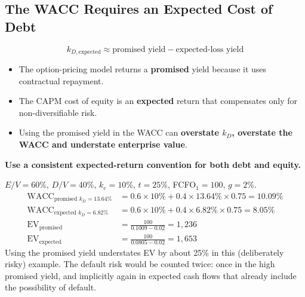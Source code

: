 \subsection{The WACC Requires an Expected Cost of Debt}
\begin{keybox}
\[
k_{D,\text{expected}}\approx\text{promised yield}-\text{expected-loss yield}
\]
\begin{itemize}[leftmargin=*]
  \item The option-pricing model returns a \textbf{promised} yield because it uses contractual repayment.
  \item The CAPM cost of equity is an \textbf{expected} return that compensates only for non-diversifiable risk.
  \item Using the promised yield in the WACC can \textbf{overstate $k_D$, overstate the WACC and understate enterprise value}.
\end{itemize}
\textbf{Use a consistent expected-return convention for both debt and equity.}
\end{keybox}

\begin{exbox}
$E/V=60\%$, $D/V=40\%$, $k_e=10\%$, $t=25\%$, FCFO$_1=100$, $g=2\%$.
\begin{align*}
\text{WACC}_{\text{promised }k_D=13.64\%}&=0.6\times10\%+0.4\times13.64\%\times0.75=10.09\%\\
\text{WACC}_{\text{expected }k_D=6.82\%}&=0.6\times10\%+0.4\times6.82\%\times0.75=8.05\%\\
\text{EV}_{\text{promised}}&=\frac{100}{0.1009-0.02}=1{,}236\\
\text{EV}_{\text{expected}}&=\frac{100}{0.0805-0.02}=1{,}653
\end{align*}
Using the promised yield understates EV by about 25\% in this (deliberately risky) example. The default risk would be counted twice: once in the high promised yield, and implicitly again in expected cash flows that already include the possibility of default.
\end{exbox}

